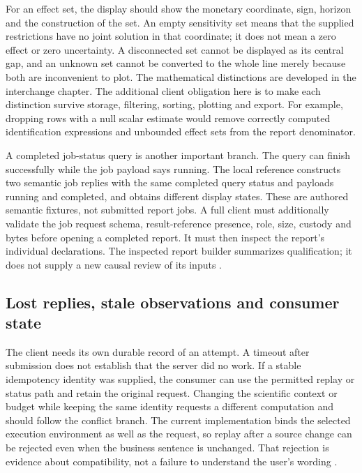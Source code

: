 For an effect set, the display should show the monetary coordinate, sign,
horizon and the construction of the set. An empty sensitivity set means that
the supplied restrictions have no joint solution in that coordinate; it does
not mean a zero effect or zero uncertainty. A disconnected set cannot be
displayed as its central gap, and an unknown set cannot be converted to the
whole line merely because both are inconvenient to plot. The mathematical
distinctions are developed in the interchange chapter. The additional client
obligation here is to make each distinction survive storage, filtering,
sorting, plotting and export. For example, dropping rows with a null scalar
estimate would remove correctly computed identification expressions and
unbounded effect sets from the report denominator.

A completed job-status query is another important branch. The query can
finish successfully while the job payload says running. The local reference
constructs two semantic job replies with the same completed query status
and payloads running and completed, and obtains different display states.
These are authored semantic fixtures, not submitted report jobs. A full
client must additionally validate the job request schema, result-reference
presence, role, size, custody and bytes before opening a completed report.
It must then inspect the report's individual declarations. The inspected
report builder summarizes qualification; it does not supply a new causal
review of its inputs \citep{exec13_i2_examples}.

\subsection{Lost replies, stale observations and consumer state}

The client needs its own durable record of an attempt. A timeout after
submission does not establish that the server did no work. If a stable
idempotency identity was supplied, the consumer can use the permitted replay
or status path and retain the original request. Changing the scientific
context or budget while keeping the same identity requests a different
computation and should follow the conflict branch. The current implementation
binds the selected execution environment as well as the request, so replay
after a source change can be rejected even when the business sentence is
unchanged. That rejection is evidence about compatibility, not a failure to
understand the user's wording \citep{exec13_i2_examples}.

